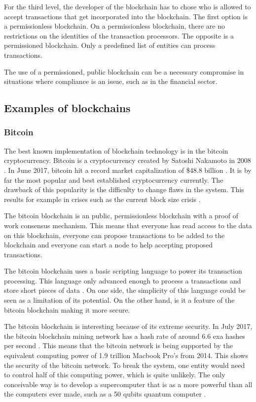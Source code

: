 For the third level, the developer of the blockchain has to chose who is allowed to accept transactions that get incorporated into the blockchain. The first option is a permissionless blockchain. On a permissionless blockchain, there are no restrictions on the identities of the transaction processors. The opposite is a permissioned blockchain. Only a predefined list of entities can process transactions. 

The use of a permissioned, public blockchain can be a necessary compromise in situations where compliance is an issue, such as in the financial sector.


\subsection{Examples of blockchains}

\subsubsection{Bitcoin}


The best known implementation of blockchain technology is in the bitcoin cryptocurrency. Bitcoin is a cryptocurrency created by Satoshi Nakamoto in 2008 \cite{bitcoin-paper}. In June 2017, bitcoin hit a record market capitalization of \$48.8 billion \cite{bitcoin-market-cap}. It is by far the most popular and best established cryptocurrency currently. The drawback of this popularity is the difficulty to change flaws in the system. This results for example in crises such as the current block size crisis \cite{bitcoin-civil-war}.

The bitcoin blockchain is an public, permissionless blockchain with a proof of work consensus mechanism. This means that everyone has read access to the data on this blockchain, everyone can propose transactions to be added to the blockchain and everyone can start a node to help accepting proposed transactions.

The bitcoin blockchain uses a basic scripting language to power its transaction processing. This language only advanced enough to process a transactions and store short pieces of data \cite{antonopoulos:2014}. On one side, the simplicity of this language could be seen as a limitation of its potential. On the other hand, is it a feature of the bitcoin blockchain making it more secure.

The bitcoin blockchain is interesting because of its extreme security. In July 2017, the bitcoin blockchain mining network has a hash rate of around 6.6 exa hashes per second \cite{bitcoin-hash-rate}. This means that the bitcoin network is being supported by the equivalent computing power of 1.9 trillion Macbook Pro's from 2014. This shows the security of the bitcoin network. To break the system, one entity would need to control half of this computing power, which is quite unlikely. The only conceivable way is to develop a supercomputer that is as a more powerful than all the computers ever made, such as a 50 qubits quantum computer \cite{quantum-newsweek}.

